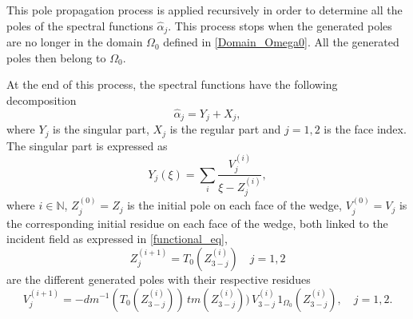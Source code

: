 This pole propagation process is applied recursively in order to determine all the poles of the spectral functions $\hat{\alpha}_j$. This process stops when the generated poles are no longer in the domain $\Omega_0$ defined in \eqref{Domain_Omega0}. All the generated poles then belong to $\Omega_0$. 

At the end of this process, the spectral functions have the following decomposition
\begin{equation}
\label{spec_decomp}
\hat{\alpha}_j=Y_j+X_j, 
\end{equation}
where  $Y_j$ is the singular part, $X_j$ is the regular part  and $j=1,2$ is the face index. The singular part is expressed as
\begin{equation}
\label{sing_part}
 Y_j(\xi) = \sum_i \dfrac{{V_j^{(i)}}}{{\xi - Z_j^{(i)}}},
\end{equation}
where $i \in \mathbb{N}$, $Z_j^{(0)} = Z_j$ is the initial pole on each face of the wedge, $V_j^{(0)}=V_j$ is the corresponding initial residue on each face of the wedge, both linked to the incident field as expressed in \eqref{functional_eq},
\begin{equation}
\label{Generated_poles}
Z_j^{(i+1)} = T_0(Z_{3-j}^{(i)}) \quad j=1,2
\end{equation} 
are the different generated poles with their respective residues 
\begin{equation}
\label{Generated_residues}
V_j^{(i+1)}=-dm^{-1}(T_0(Z_{3-j}^{(i)})) \,  tm(Z_{3-j}^{(i)})) \, V_{3-j}^{(i)} \, 1_{\Omega_0}(Z_{3-j}^{(i)}), \quad  j=1,2.
\end{equation}
